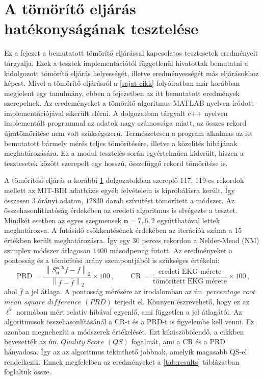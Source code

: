 \documentclass[oneside,titlepage,12pt,a4paper]{report}
\DeclareMathOperator{\PRD}{PRD}
\DeclareMathOperator{\CR}{CR}
\newcommand{\conj}[1]{\overline{#1}}
\begin{document}
\section{A tömörítő eljárás hatékonyságának tesztelése}

	Ez a fejezet a bemutatott tömörítő eljárással kapcsolatos tesztesetek eredményeit tárgyalja. Ezek a tesztek implementációtól függetlenül hivatottak bemutatni a kidolgozott tömörítő eljárás helyességét, illetve eredményességét más eljárásokhoz képest. Mivel a tömörítő eljárásról a \ref{sajat cikk} folyóiratban már korábban megjelent egy tanulmány, ebben a fejezetben az itt bemutatott eredmények szerepelnek. Az eredeményeket a tömörítő algoritmus MATLAB nyelven íródott implementációjával sikerült elérni. A dolgozatban tárgyalt c++ nyelven implementált programmal az adatok nagy számossága miatt, az összes rekord újratömörítése nem volt szükségszerű. Természetesen a program alkalmas az itt bemutatott bármely mérés teljes tömörítésére, illetve a közelítés hibájának meghatározására. Ez a modul tesztelés során egyértelműen kiderült, hiszen a tesztesetek között szerepelt egy hosszú, összefüggő rekord tömörítése is. 
\par A tömörítési eljárás a korábbi \ref{} dolgozatokban szereplő 117, 119-es rekordok mellett az MIT-BIH adatbázis egyéb felvételein is kipróbálásra került. Így összesen $3$ órányi adaton, $12830$ darab szívütést tömörített a módszer. Az összehasonlíthatóság érdekében az eredeti \cite{hexp3} algoritmus is elvégezte a tesztet. Mindkét esetben az egyes szegmensek $\mathbf{n}=7,6,2$ együtthatóval lettek meghatározva. A futásidő csökkentésének érdekében az iterációk száma a 15 értékben került meghatározásra. Így egy $30$ perces rekordon a Nelder-Mead (NM) szimplex módszer átlagosan $1400$ másodpercig futott. Az eredményeket a pontosság és a tömörítési arány szempontjából is szükséges értékelni:
\begin{equation*}
		\PRD=\frac{\left\|S_{\mathbf{n}}^{\mathbf{a},\boldsymbol{\lambda}}f-f\right\|_2}{\left\|f-\conj{f}\right\|_2}\times 100\,,\qquad  \CR=\frac{\text{eredeti EKG mérete}}{\text{tömörített EKG mérete}}\times 100\,,
		\label{eq:prd_cr}
\end{equation*}
ahol $\conj{f}$ a jel átlaga. A pontosság mérésére az irodalomban az ún. $percentage$ $root$ $mean$ $square$ $difference$ $(PRD)$ terjedt el. Könnyen észrevehető, hogy ez az $\ell^2$ normában mért relatív hibával egyenlő, ami független a jel átlagától. Az algoritmusok összehasonlításánál a CR-t és a PRD-t is figyelembe kell venni. Ez azonban megnehezíti a módszerek értékelését. Ezt kiküszöbölendő, a \cite{pkselect} cikkben bevezették az ún. $Quality\ Score$ $(QS)$ fogalmát, ami a CR és a PRD hányadosa. Így az az algoritmus tekinthető jobbnak, amelyik magasabb QS-el rendelkezik. Ennek megfelelően az eredményeket a \ref{tab:results} táblázatban foglaltuk össze.
\end{document}
